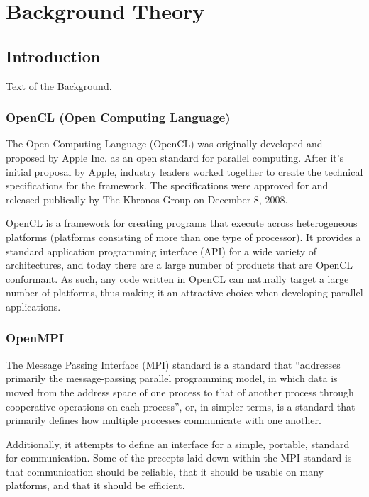\documentclass[../thesis.tex]{subfiles}
\begin{document}
\chapter{Background Theory}

\label{ch:background}

\section{Introduction}

Text of the Background.


    \subsection{OpenCL (Open Computing Language)} %
    \label{sub:opencl}
        The Open Computing Language (OpenCL) was originally developed and proposed by Apple Inc. as an open standard for parallel computing. After it's initial proposal by Apple, industry leaders worked together to create the technical specifications for the framework. The specifications were approved for and released publically by The Khronos Group on December 8, 2008\cite{opencl10pressrelease}.

        OpenCL is a framework for creating programs that execute across heterogeneous platforms (platforms consisting of more than one type of processor). It provides a standard application programming interface (API) for a wide variety of architectures, and today there are a large number of products that are OpenCL conformant\cite{khronosconformance}. As such, any code written in OpenCL can naturally target a large number of platforms, thus making it an attractive choice when developing parallel applications.  

    \subsection{OpenMPI} %
    \label{sub:openmpi}
        The Message Passing Interface (MPI) standard is a standard that ``addresses primarily the message-passing parallel programming model, in which data is moved from the address space of one process to that of another process through cooperative operations on each process''\cite{MPI-2.2}, or, in simpler terms, is a standard that primarily defines how multiple processes communicate with one another. 

        Additionally, it attempts to define an interface for a simple, portable, standard for communication. Some of the precepts laid down within the MPI standard is that communication should be reliable, that it should be usable on many platforms, and that it should be efficient.
\end{document}
